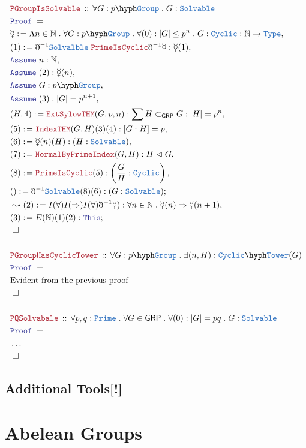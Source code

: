 \documentclass[12pt]{scrartcl}
\newcommand{\TYPE}[1]{\textcolor{NavyBlue}{\mathtt{#1}}}
\newcommand{\LOGIC}[1]{\textcolor{Blue}{\mathtt{#1}}}
\newcommand{\THM}[1]{\textcolor{Maroon}{\mathtt{#1}}}
\renewcommand{\.}{\; . \;}
\newcommand{\de}{: \kern 0.1pc =}
\newcommand{\Theorem}[2]{& \THM{#1} \, :: \, #2 \\ & \Proof = \\ }
\newcommand{\Page}[1]{ \begin{align*} #1 \end{align*}   }
\newcommand{ \bd }{ \ByDef }
\newcommand{\NoProof}{ & \ldots \\ \EndProof}
\newcommand{\Type}{\TYPE{Type}}
\newcommand{\Nat}{\mathbb{N} }
\newcommand{\Say}[3]{& #1 \de #2 : #3, \\}
\newcommand{\Conclude}[3]{& #1 \de #2 : #3; \\}
\newcommand{\Derive}[3]{& \leadsto #1 \de #2 : #3, \\}
\newcommand{\Assume}[2]{& \LOGIC{Assume} \; #1 : #2, \\}
\newcommand{\QED}{\; \square}
\newcommand{\EndProof}{& \QED \\}
\newcommand{\ByDef}{\eth}
\newcommand{\Proof}{\LOGIC{Proof} \; }
\newcommand{\Sgrp}{\subset_{\mathsf{GRP}}}
\newcommand{\Nrml}{\vartriangleleft}
\newcommand{\GRP}{\mathsf{GRP}}
\begin{document}
\Page{
	\Theorem{PGroupIsSolvable}{\forall G : p \hyph \TYPE{Group} \.  G : \TYPE{Solvable}}
	\Say{\mercury}{\Lambda n \in \Nat \. \forall  G  : p \hyph \TYPE{Group} \. 
		\forall (0) : |G| \le p^n \.  G : \TYPE{Cyclic}  
	}{\Nat \to \Type}
	\Say{(1)}{\bd^{-1} \TYPE{Solvalble}\;\THM{PrimeIsCyclic} \bd^{-1} \mercury}{\mercury(1)}
	\Assume{n}{\Nat}
	\Assume{(2)}{\mercury(n)}
	\Assume{G}{p\hyph \TYPE{Group}}
	\Assume{(3)}{ |G| = p^{n + 1}}
	\Say{(H,4)}{\THM{ExtSylowTHM}(G,p,n)}{ \sum H \Sgrp G : |H| = p^n  }
	\Say{(5)}{\THM{IndexTHM}(G,H)(3)(4)}{ [G:H] = p }
	\Say{(6)}{\mercury(n)(H)}{(H : \TYPE{Solvable})}
	\Say{(7)}{\THM{NormalByPrimeIndex}(G,H)}{ H \Nrml G}
	\Say{(8)}{\THM{PrimeIsCyclic}(5)}{ \left( \frac{G}{H} : \TYPE{Cyclic} \right)   }
	\Conclude{()}{\bd^{-1} \TYPE{Solvable}(8)(6)}{(G : \TYPE{Solvable})}
	\Derive{(2)}{I(\forall)I(\Rightarrow)I(\forall)\bd^{-1} \mercury)}{ \forall n \in \Nat \. \mercury(n) \Rightarrow 
	    \mercury(n + 1) }
	\Conclude{(3)}{E(\Nat)(1)(2)}{\LOGIC{This}}
	\EndProof
	\\
	\Theorem{PGroupHasCyclicTower}{\forall G : p \hyph \TYPE{Group} \. \exists (n,H) : \TYPE{Cyclic}\hyph\TYPE{Tower}(G) }
	& \text{Evident from the previous proof} \\
	\EndProof
	\\
	\Theorem{PQSolvabale}{\forall p,q : \TYPE{Prime} \. \forall G \in \GRP \. \forall (0) : |G| = pq \. G : \TYPE{Solvable} }
	\NoProof
}
\subsection{Additional Tools[!]}
\newpage
\section{Abelean Groups}
\end{document}
